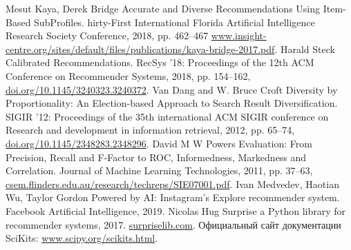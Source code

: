 \documentclass[a4paper,article,12pt]{extarticle}
\begin{document}


\tableofcontents
\pagebreak






\pagebreak


\pagebreak


\pagebreak


\pagebreak



\pagebreak

\begin{thebibliography}{1}
 Mesut Kaya, Derek Bridge \flqq Accurate and Diverse Recommendations Using Item-Based SubProfiles\frqq. 	hirty-First International Florida Artificial Intelligence Research Society Conference, 2018, pp. 462--467 \href{https://www.insight-centre.org/sites/default/files/publications/kaya-bridge-2017.pdf}{www.insight-centre.org/sites/default/files/publications/kaya-bridge-2017.pdf}.
 Harald Steck \flqq Calibrated Recommendations\frqq. RecSys '18: Proceedings of the 12th ACM Conference on Recommender Systems, 2018, pp. 154--162, \href{https://doi.org/10.1145/3240323.3240372}{doi.org/10.1145/3240323.3240372}.
 Van Dang and W. Bruce Croft \flqq Diversity by Proportionality: An Election-based Approach to Search Result Diversification\frqq. SIGIR '12: Proceedings of the 35th international ACM SIGIR conference on Research and development in information retrieval, 2012, pp. 65--74, \href{https://doi.org/10.1145/2348283.2348296}{doi.org/10.1145/2348283.2348296}.
 David M W Powers \flqq Evaluation: From Precision, Recall and F-Factor to ROC, Informedness, Markedness and Correlation\frqq. Journal of Machine Learning Technologies, 2011, pp. 37--63, \href{https://csem.flinders.edu.au/research/techreps/SIE07001.pdf}{csem.flinders.edu.au/research/techreps/SIE07001.pdf}.
 Ivan Medvedev, Haotian Wu, Taylor Gordon \flqq Powered by AI: Instagram’s Explore recommender system\frqq. Facebook Artificial Intelligence, 2019.
 Nicolas Hug \flqq Surprise a Python library for recommender systems\frqq, 2017. \href{http://surpriselib.com}{surpriselib.com}.
 Официальный сайт документации SciKits: \href{https://www.scipy.org/scikits.html}{www.scipy.org/scikits.html}.

\end{thebibliography}
\end{document}
